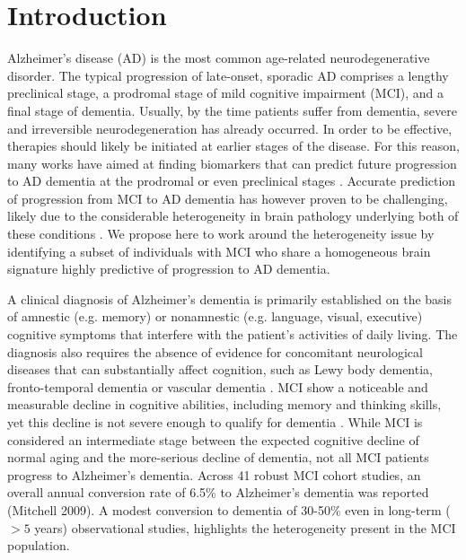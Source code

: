 \documentclass[authoryear]{elsarticle}
\begin{document}
\section{Introduction}
Alzheimer's disease (AD) is the most common age-related neurodegenerative disorder. The typical progression of late-onset, sporadic AD comprises a lengthy preclinical stage, a prodromal stage of mild cognitive impairment (MCI), and a final stage of dementia. Usually, by the time patients suffer from dementia, severe and irreversible neurodegeneration has already occurred. In order to be effective, therapies should likely be initiated at earlier stages of the disease. For this reason, many works have aimed at finding biomarkers that can predict future progression to AD dementia at the prodromal or even preclinical stages \citep{Rathore2017review,Orban2017c}. Accurate prediction of progression from MCI to AD dementia has however proven to be challenging, likely due to the considerable heterogeneity in brain pathology underlying both of these conditions \citep{Rathore2017review}. We propose here to work around the heterogeneity issue by identifying a subset of individuals with MCI who share a homogeneous brain signature highly predictive of progression to AD dementia.

A clinical diagnosis of Alzheimer's dementia is primarily established on the basis of amnestic (e.g. memory) or nonamnestic (e.g. language, visual, executive) cognitive symptoms that interfere with the patient's activities of daily living. The diagnosis also requires the absence of evidence for concomitant neurological diseases that can substantially affect cognition, such as Lewy body dementia, fronto-temporal dementia or vascular dementia \citep{Mckhann2011}. MCI show a noticeable and measurable decline in cognitive abilities, including memory and thinking skills, yet this decline is not severe enough to qualify for dementia \citep{Petersen2014}. While MCI is considered an intermediate stage between the expected cognitive decline of normal aging and the more-serious decline of dementia, not all MCI patients progress to Alzheimer's dementia. Across 41 robust MCI cohort studies, an overall annual conversion rate of 6.5\% to Alzheimer's dementia was reported (Mitchell 2009). A modest conversion to dementia of 30-50\% even in long-term ($>5$ years) observational studies, highlights the heterogeneity present in the MCI population.
\end{document}
